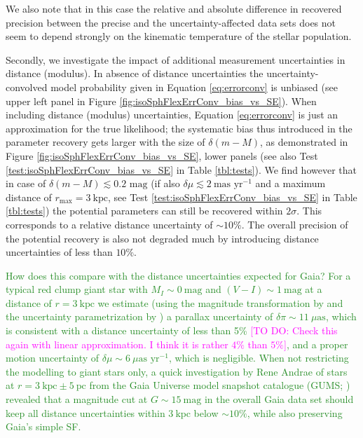 \documentclass[iop,revtex4]{emulateapj}
\newcommand{\NEW}[1]{\textcolor{ForestGreen}{#1}}
\newcommand{\Wilma}[1]{\textcolor{Magenta}{#1}}
\begin{document}
We also note that in this case the relative and absolute difference in recovered precision between the precise and the uncertainty-affected data sets does not seem to depend strongly on the kinematic temperature of the stellar population.

Secondly, we investigate the impact of additional measurement uncertainties in distance (modulus). In absence of distance uncertainties the uncertainty-convolved model probability given in Equation \eqref{eq:errorconv} is unbiased (see upper left panel in Figure \ref{fig:isoSphFlexErrConv_bias_vs_SE}).  When including distance (modulus) uncertainties, Equation \eqref{eq:errorconv} is just an approximation for the true likelihood; the systematic bias thus introduced in the parameter recovery gets larger with the size of $\delta (m-M)$, as demonstrated in Figure \ref{fig:isoSphFlexErrConv_bias_vs_SE}, lower panels (see also Test \ref{test:isoSphFlexErrConv_bias_vs_SE} in Table \ref{tbl:tests}).  We find however that in case of $\delta(m-M) \lesssim 0.2 \text{ mag}$ (if also $\delta \mu \lesssim 2 ~\text{mas yr}^{-1}$ and a maximum distance of $r_\text{max} = 3~\text{kpc}$, see Test \ref{test:isoSphFlexErrConv_bias_vs_SE} in Table \ref{tbl:tests}) the potential parameters can still be recovered within $2 \sigma$. This corresponds to a relative distance uncertainty of $\sim10\%$. The overall precision of the potential recovery is also not degraded much by introducing distance uncertainties of less than $10\%$.

\NEW{How does this compare with the distance uncertainties expected for Gaia? For a typical red clump giant star with $M_I\sim0~\text{mag}$ and $(V-I)\sim1~\text{mag}$ at a distance of $r=3~\text{kpc}$ we estimate (using the magnitude transformation by \citet{2010A&A...523A..48J} and the uncertainty parametrization by \citet{2014EAS....67...23D}) a parallax uncertainty of $\delta\pi\sim11~\mu\text{as}$, which is consistent with a distance uncertainty of less than 5\% \Wilma{[TO DO: Check this again with linear approximation. I think it is rather $4\%$ than $5\%$]}, and a proper motion uncertainty of $\delta \mu\sim6~\mu\text{as yr}^{-1}$, which is negligible. When not restricting the modelling to giant stars only, a quick investigation by Rene Andrae of stars at $r=3~\text{kpc}\pm5~\text{pc}$ from the Gaia Universe model snapshot catalogue (GUMS; \citealt{2012A&A...543A.100R}) revealed that a magnitude cut at $G\sim15~\text{mag}$ in the overall Gaia data set should keep all distance uncertainties within $3~\text{kpc}$ below $\sim10\%$, while also preserving Gaia's simple SF.}
\end{document}
